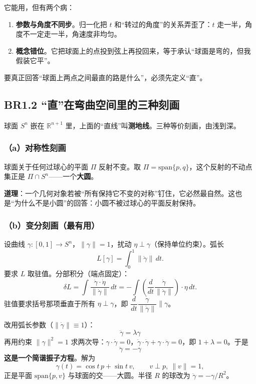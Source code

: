 它能用，但有两个病：

\begin{enumerate}
  \item \textbf{参数与角度不同步}。归一化把 $t$ 和“转过的角度”的关系弄歪了：$t$ 走一半，角度不一定走一半，角速度非均匀。
  \item \textbf{概念错位}。它把球面上的点投到弦上再投回来，等于承认“球面是弯的，但我假装它平”。
\end{enumerate}

要真正回答“球面上两点之间最直的路是什么”，必须先定义“直”。

\subsection{BR1.2 “直”在弯曲空间里的三种刻画}

球面 $S^n$ 嵌在 $\mathbb{R}^{n+1}$ 里，上面的“直线”叫\textbf{测地线}。三种等价刻画，由浅到深。

\subsubsection{（a）对称性刻画}

球面关于任何过球心的平面 $\Pi$ 反射不变。取 $\Pi=\mathrm{span}\{p,q\}$，这个反射的不动点集正是 $\Pi\cap S^n$——一个\textbf{大圆}。

\textbf{道理}：一个几何对象若被“所有保持它不变的对称”钉住，它必然最自然。这也是“为什么不是小圆”的回答：小圆不被过球心的平面反射保持。

\subsubsection{（b）变分刻画（最有用）}

设曲线 $\gamma:[0,1]\to S^n$，$\lVert\gamma\rVert=1$，扰动 $\eta\perp\gamma$（保持单位约束）。弧长
\[
L[\gamma]=\int_0^1 \lVert\dot\gamma\rVert\,dt .
\]
要求 $L$ 取驻值。分部积分（端点固定）：
\[
\delta L=\int \frac{\dot\gamma\cdot\dot\eta}{\lVert\dot\gamma\rVert}\,dt
=-\int\left(\frac{d}{dt}\frac{\dot\gamma}{\lVert\dot\gamma\rVert}\right)\cdot\eta\,dt .
\]
驻值要求括号那项垂直于所有 $\eta\perp\gamma$，即 $\dfrac{d}{dt}\dfrac{\dot\gamma}{\lVert\dot\gamma\rVert}\parallel\gamma$。

改用弧长参数（$\lVert\dot\gamma\rVert\equiv 1$）：
\[
\boxed{\ \ddot\gamma=\lambda\gamma\ }
\]
再用约束 $\lVert\gamma\rVert^2=1$ 求两次导：$\gamma\cdot\dot\gamma=0$，$\dot\gamma\cdot\dot\gamma+\gamma\cdot\ddot\gamma=0$，即 $1+\lambda=0$。于是
\[
\boxed{\ \ddot\gamma=-\gamma\ }
\]
\textbf{这是一个简谐振子方程}。解为
\[
\gamma(t)=\cos t\,p+\sin t\,v,\qquad v\perp p,\ \lVert v\rVert=1,
\]
正是平面 $\mathrm{span}\{p,v\}$ 与球面的交——大圆。半径 $R$ 的球改为 $\ddot\gamma=-\gamma/R^2$。

